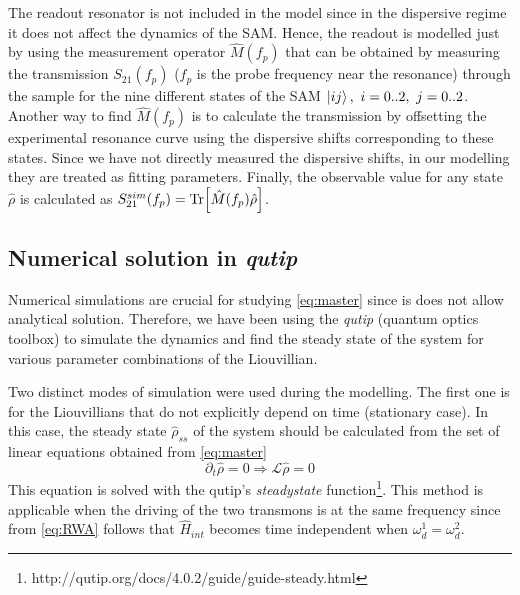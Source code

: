 \documentclass[%
 prx,
 amsmath,amssymb,
 reprint,%
]{revtex4-1}
\begin{document}
The readout resonator is not included in the model since in the dispersive regime it does not affect the dynamics of the SAM. Hence, the readout is modelled just by using the measurement operator $\hat M(f_p)$ that can be obtained by measuring the transmission $S_{21}(f_p)$ ($f_p$ is the probe frequency near the resonance) through the sample for the nine different states of the SAM $\ket{ij},\ i=0..2,\ j=0..2$\cite{filipp2009two}. Another way to find $\hat M(f_p)$ is to calculate the transmission by offsetting the experimental resonance curve using the dispersive shifts corresponding to these states. Since we have not directly measured the dispersive shifts, in our modelling they are treated as fitting parameters. Finally, the observable value for any state $\hat \rho$ is calculated as $S_{21}^{sim}(f_p) = \Tr[\hat M(f_p) \hat \rho]$.


\subsection{Numerical solution in \textit{qutip}}


Numerical simulations are crucial for studying \autoref{eq:master} since is does not allow  analytical solution. Therefore, we have been using the \textit{qutip}\cite{johansson2013qutip} (quantum optics toolbox) to simulate the dynamics and find the steady state of the system for various parameter combinations of the Liouvillian.

Two distinct modes of simulation were used during the modelling. The first one is for the Liouvillians that do not explicitly depend on time (stationary case). In this case, the steady state $\hat \rho_{ss}$ of the system should be calculated from the set of linear equations obtained from \autoref{eq:master}
\begin{equation}
\partial_t \hat \rho = 0  \Rightarrow \mathcal{L} \hat \rho = 0
\end{equation}
This equation is solved with the qutip's \textit{steadystate} function\footnote{http://qutip.org/docs/4.0.2/guide/guide-steady.html}. This method is applicable when the driving of the two transmons is at the same frequency since from \autoref{eq:RWA} follows that $\hat H_{int}$ becomes time independent when $\omega_d^1 = \omega_d^2$.
\end{document}
